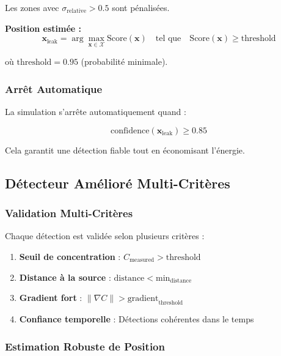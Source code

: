 \documentclass[12pt,a4paper]{article}
\begin{document}
Les zones avec $\sigma_{\text{relative}} > 0.5$ sont pénalisées.

\textbf{Position estimée :}
\begin{equation}
\mathbf{x}_{\text{leak}} = \arg\max_{\mathbf{x} \in \mathcal{X}} \text{Score}(\mathbf{x}) \quad \text{tel que} \quad \text{Score}(\mathbf{x}) \geq \text{threshold}
\end{equation}

où $\text{threshold} = 0.95$ (probabilité minimale).

\subsubsection{Arrêt Automatique}

La simulation s'arrête automatiquement quand :

\begin{equation}
\text{confidence}(\mathbf{x}_{\text{leak}}) \geq 0.85
\end{equation}

Cela garantit une détection fiable tout en économisant l'énergie.

\subsection{Détecteur Amélioré Multi-Critères}

\subsubsection{Validation Multi-Critères}

Chaque détection est validée selon plusieurs critères :

\begin{enumerate}
    \item \textbf{Seuil de concentration} : $C_{\text{measured}} > \text{threshold}$
    \item \textbf{Distance à la source} : $\text{distance} < \text{min}_{\text{distance}}$
    \item \textbf{Gradient fort} : $\|\nabla C\| > \text{gradient}_{\text{threshold}}$
    \item \textbf{Confiance temporelle} : Détections cohérentes dans le temps
\end{enumerate}

\subsubsection{Estimation Robuste de Position}
\end{document}
